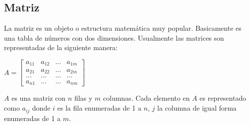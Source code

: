 \subsection{Matriz}

La matriz es un objeto o estructura matemática muy popular. Basicamente es una tabla de números con dos dimensiones. Usualmente las matrices son representadas de la siguiente manera:

\vspace*{0.3in}

$A=\begin{bmatrix}
	a_{11} & a_{12} & ... & a_{1m} \\ 
	a_{21} & a_{22} & ... & a_{2m} \\ 
	... & ... & ... & ... \\ 
	a_{n1} & ... & ... & a_{nm}
\end{bmatrix} $ 

\vspace*{0.3in}

$A$ es una matriz con $n$ filas y $m$ columnas. Cada elemento en $A$ es representado como $a_{ij}$ donde $i$ es la fila enumeradas de 1 a $n$, $j$ la columna de igual forma enumeradas de 1 a $m$.